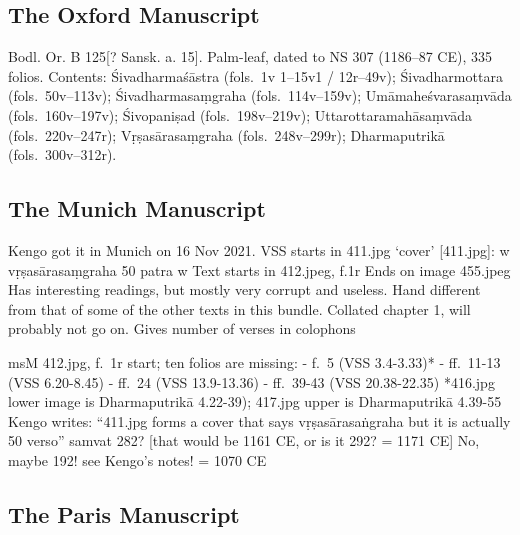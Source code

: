 \documentclass[11pt]{book}
\begin{document}
\subsection{The Oxford Manuscript}

Bodl. Or. B 125{[}? Sansk. a. 15{]}. Palm-leaf, dated to NS 307
(1186--87 CE), 335 folios. Contents: Śivadharmaśāstra (fols.~1v 1--15v1
/ 12r--49v); Śivadharmottara (fols.~50v--113v); Śivadharmasaṃgraha
(fols.~114v--159v); Umāmaheśvarasaṃvāda (fols.~160v--197v); Śivopaniṣad
(fols.~198v--219v); Uttarottaramahāsaṃvāda (fols.~220v--247r);
Vṛṣasārasaṃgraha (fols.~248v--299r); Dharmaputrikā (fols.~300v--312r).


\subsection{The Munich Manuscript}

Kengo got it in Munich on 16 Nov 2021. VSS starts in 411.jpg `cover'
{[}411.jpg{]}: \textbar{}\textbar{}w\textbar{}\textbar{}
vṛṣasārasaṃgraha 50 patra \textbar{}\textbar{}w\textbar{}\textbar{} Text
starts in 412.jpeg, f.1r Ends on image 455.jpeg Has interesting
readings, but mostly very corrupt and useless. Hand different from that
of some of the other texts in this bundle. Collated chapter 1, will
probably not go on. Gives number of verses in colophons

msM 412.jpg, f.~1r start; ten folios are missing: - f.~5 (VSS 3.4-3.33)*
- ff.~11-13 (VSS 6.20-8.45) - ff.~24 (VSS 13.9-13.36) - ff.~39-43 (VSS
20.38-22.35) *416.jpg lower image is Dharmaputrikā 4.22-39); 417.jpg
upper is Dharmaputrikā 4.39-55 Kengo writes: ``411.jpg forms a cover
that says vṛṣasārasaṅgraha but it is actually 50 verso'' samvat 282?
{[}that would be 1161 CE, or is it 292? = 1171 CE{]} No, maybe 192! see
Kengo's notes! = 1070 CE


\subsection{The Paris Manuscript}
\end{document}
